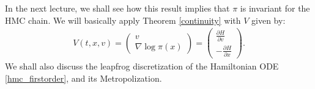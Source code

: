 \documentclass{scrartcl}
\begin{document}
In the next lecture, we shall see how this result implies that $\pi$
is invariant for the HMC chain. We will basically apply Theorem
\ref{continuity} with $V$ given by:
\begin{align*}
  V(t, x, v) =
  \begin{pmatrix}
    v \\ \nabla \log \pi(x)
  \end{pmatrix} =
  \begin{pmatrix}
    \frac{\partial H}{\partial v} \\ -\frac{\partial H}{\partial x}
  \end{pmatrix}. 
\end{align*}
We shall also discuss the leapfrog discretization of the Hamiltonian
ODE \eqref{hmc_firstorder}, and its Metropolization. 
\end{document}
